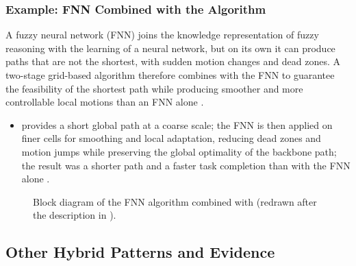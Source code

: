 \subsubsection{Example: FNN Combined with the \texorpdfstring{\Astar}{A*} Algorithm}

A fuzzy neural network (FNN) joins the knowledge representation of fuzzy
reasoning with the learning of a neural network, but on its own it can produce
paths that are not the shortest, with sudden motion changes and dead zones. A
two-stage grid-based algorithm therefore combines \Astar{} with the FNN to
guarantee the feasibility of the shortest path while producing smoother and more
controllable local motions than an FNN alone \cite{tan2016handbook}.
\begin{itemize}
  \item {} \Astar{} provides a short global path at a coarse
        scale; the FNN is then applied on finer cells for smoothing and local
        adaptation, reducing dead zones and motion jumps while preserving the
        global optimality of the backbone path; the result was a shorter path
        and a faster task completion than with the FNN alone \cite{tan2016handbook}.
\end{itemize}

\begin{figure}[htbp]
  \centering
  \caption{Block diagram of the FNN algorithm combined with \Astar{} (redrawn after
           the description in \cite{tan2016handbook}).}
  \label{fig:fnn-astar}
\end{figure}

\subsection{Other Hybrid Patterns and Evidence}

